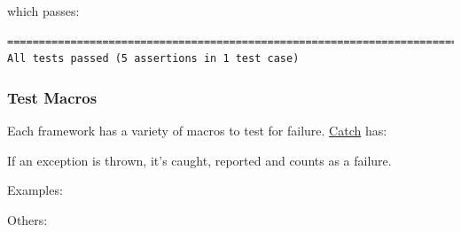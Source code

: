 which passes:

\begin{verbatim}
===============================================================================
All tests passed (5 assertions in 1 test case)

\end{verbatim}

\subsubsection{Test Macros}\label{test-macros}

Each framework has a variety of macros to test for failure.
\href{https://github.com/philsquared/Catch}{Catch} has:

\begin{Shaded}
\begin{Highlighting}[]
\end{Highlighting}
\end{Shaded}

If an exception is thrown, it's caught, reported and counts as a
failure.

Examples:

\begin{Shaded}
\begin{Highlighting}[]
     \NormalTok{);}
     \NormalTok{);}
\end{Highlighting}
\end{Shaded}

Others:

\begin{Shaded}
\begin{Highlighting}[]
     
       
\end{Highlighting}
\end{Shaded}

